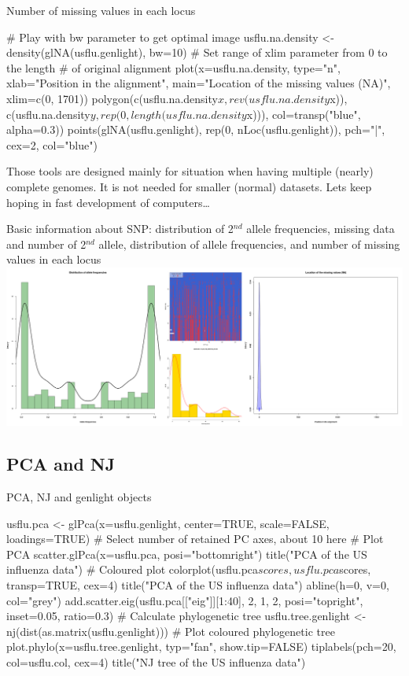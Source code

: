\documentclass[compress, ucs, xelatex, 11pt, xcolor=svgnames,
  hyperref={
    bookmarks=true,
    unicode=true,
    colorlinks=true,
    pdftitle={Molecular data in R},
    plainpages=false,
    pdfauthor={Vojtech Zeisek},
    pdfsubject={Course about phylogeny and evolution in R},
    pdfcreator={XeLaTeX},
    pdfkeywords={R, evolution, phylogeny, molecular data},
    linkcolor=Tomato,
    anchorcolor=SaddleBrown,
    citecolor=Goldenrod,
    filecolor=DarkMagenta,
    menucolor=Sienna,
    urlcolor=DarkTurquoise,
    pdftex},
  url={hyphens, lowtilde} %
  ]{beamer}
\begin{document}
\begin{frame}[fragile]{Number of missing values in each locus}
  \begin{spluscode}
    # Play with bw parameter to get optimal image
    usflu.na.density <- density(glNA(usflu.genlight), bw=10)
    # Set range of xlim parameter from 0 to the length
    # of original alignment
    plot(x=usflu.na.density, type="n", xlab="Position in the alignment",
      main="Location of the missing values (NA)", xlim=c(0, 1701))
    polygon(c(usflu.na.density$x, rev(usflu.na.density$x)),
      c(usflu.na.density$y, rep(0, length(usflu.na.density$x))),
      col=transp("blue", alpha=0.3))
    points(glNA(usflu.genlight), rep(0, nLoc(usflu.genlight)), 
      pch="|", cex=2, col="blue")
  \end{spluscode}
\vfill
Those tools are designed mainly for situation when having multiple (nearly) complete genomes. It is not needed for smaller (normal) datasets. Lets keep hoping in fast development of computers\ldots
\end{frame}

\begin{frame}{Basic information about SNP: distribution of 2$^{nd}$ allele frequencies, missing data and number of 2$^{nd}$ allele, distribution of allele frequencies, and number of missing values in each locus}
\includegraphics[width=\textwidth]{flu_alleles.png}
\end{frame}

\subsection{PCA and NJ}

\begin{frame}[fragile]{PCA, NJ and genlight objects}
  \begin{spluscode}
    usflu.pca <- glPca(x=usflu.genlight, center=TRUE, scale=FALSE,
      loadings=TRUE) # Select number of retained PC axes, about 10 here
    # Plot PCA
    scatter.glPca(x=usflu.pca, posi="bottomright")
    title("PCA of the US influenza data")
    # Coloured plot
    colorplot(usflu.pca$scores, usflu.pca$scores, transp=TRUE, cex=4)
    title("PCA of the US influenza data")
    abline(h=0, v=0, col="grey")
    add.scatter.eig(usflu.pca[["eig"]][1:40], 2, 1, 2, posi="topright",
      inset=0.05, ratio=0.3)
    # Calculate phylogenetic tree
    usflu.tree.genlight <- nj(dist(as.matrix(usflu.genlight)))
    # Plot coloured phylogenetic tree
    plot.phylo(x=usflu.tree.genlight, typ="fan", show.tip=FALSE)
    tiplabels(pch=20, col=usflu.col, cex=4)
    title("NJ tree of the US influenza data")
  \end{spluscode}
\end{frame}
\end{document}
